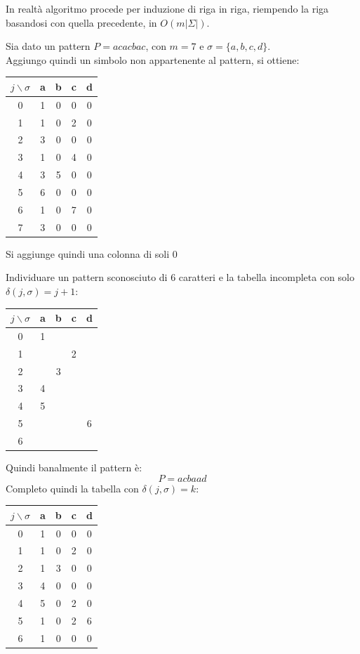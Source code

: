 \documentclass[a4paper,12pt, oneside]{book}
\begin{document}
In realtà algoritmo procede per induzione di riga in riga, riempendo la riga
basandosi con quella precedente, in $O(m|\Sigma|)$.\\
\newpage
\begin{esempio}
  Sia dato un pattern $P=acacbac$, con $m=7$ e $\sigma=\{a,b,c,d\}$.\\
  Aggiungo quindi un simbolo non appartenente al pattern, si ottiene:
   \begin{table}[H]
    \centering
    \begin{tabular}[H]{c||c|c|c|c}
      $j\backslash\sigma$ & a & b & c & d\\
      \hline
      \hline
      0 & 1 & 0 & 0 & 0\\
      1 & 1 & 0 & 2 & 0\\
      2 & 3 & 0 & 0 & 0\\
      3 & 1 & 0 & 4 & 0\\
      4 & 3 & 5 & 0 & 0\\ 
      5 & 6 & 0 & 0 & 0\\
      6 & 1 & 0 & 7 & 0\\
      7 & 3 & 0 & 0 & 0      
    \end{tabular}
  \end{table}
  Si aggiunge quindi una colonna di soli 0
\end{esempio}

\begin{esempio}
  Individuare un pattern sconosciuto di 6 caratteri e la tabella incompleta con
  solo $\delta(j,\sigma)=j+1$:
  \begin{table}[H]
    \centering
    \begin{tabular}[H]{c||c|c|c|c}
      $j\backslash\sigma$ & a & b & c & d\\
      \hline
      \hline
      0 & 1 &  &  & \\
      1 &  &  & 2 & \\
      2 &  & 3 &  & \\
      3 & 4 &  &  & \\
      4 & 5 &  &  & \\ 
      5 &  &  &  & 6\\
      6 &  &  &  &   
    \end{tabular}
  \end{table}
  Quindi banalmente il pattern è:
  \[P=acbaad\]
  Completo quindi la tabella con $\delta(j,\sigma)=k$:
  \begin{table}[H]
    \centering
    \begin{tabular}[H]{c||c|c|c|c}
      $j\backslash\sigma$ & a & b & c & d\\
      \hline
      \hline
      0 & 1 & 0 & 0 & 0\\
      1 &  1& 0 & 2 &0 \\
      2 &  1& 3 & 0 & 0\\
      3 & 4 & 0 & 0 & 0\\
      4 & 5 & 0 &2  &0 \\ 
      5 & 1 & 0 & 2 & 6\\
      6 & 1 & 0 & 0&  0 
    \end{tabular}
  \end{table}
\end{esempio}
\end{document}
